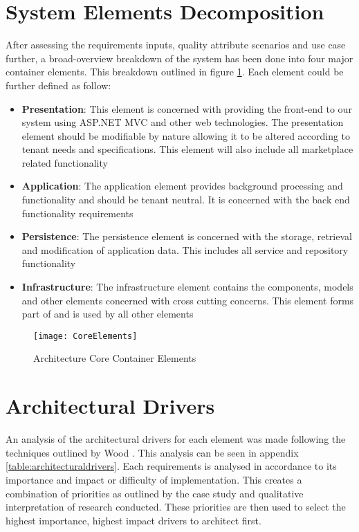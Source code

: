 \section{System Elements Decomposition}
After assessing the requirements inputs, quality attribute scenarios and use case further, a broad-overview breakdown of the system has been done into four major container elements. This breakdown outlined in figure \ref{fig:elements}. Each element could be further defined as follow:
\begin{itemize}
\item \textbf{Presentation}: This element is concerned with providing the front-end to our system using ASP.NET MVC and other web technologies. The presentation element should be modifiable by nature allowing it to be altered according to tenant needs and specifications. This element will also include all marketplace related functionality
\item \textbf{Application}: The application element provides background processing and functionality and should be tenant neutral. It is concerned with the back end functionality requirements
\item \textbf{Persistence}: The persistence element is concerned with the storage, retrieval and modification of application data. This includes all service and repository functionality
\item \textbf{Infrastructure}: The infrastructure element contains the components, models and other elements concerned with cross cutting concerns. This element forms part of and is used by all other elements
\end{itemize}

\begin{figure}
\centering
\texttt{[image: CoreElements]}
\caption{Architecture Core Container Elements}
\label{fig:elements}
\end{figure}


\section{Architectural Drivers}
An analysis of the architectural drivers for each element was made following the techniques outlined by Wood \cite{Wood2007}. This analysis can be seen in appendix \ref{table:architecturaldrivers}. Each requirements is analysed in accordance to its importance and impact or difficulty of implementation. This creates a combination of priorities as outlined by the case study and qualitative interpretation of research conducted. These priorities are then used to select the highest importance, highest impact drivers to architect first. 

